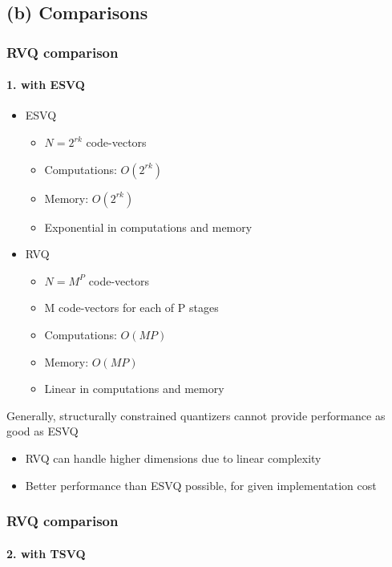 \subsection{(b) Comparisons}
\begin{frame}
\frametitle{RVQ comparison}\logoCSIPCPL\mypagenum
\framesubtitle{1. with ESVQ}
	\begin{itemize}
		\item ESVQ
			\begin{itemize}
				\item $N=2^{rk}$ code-vectors
				\item Computations: $O(2^{rk})$
				\item Memory: $O(2^{rk})$
				\item Exponential in computations and memory
			\end{itemize}
		\item RVQ
			\begin{itemize}
				\item $N={M^P}$ code-vectors
				\item M code-vectors for each of P stages
				\item Computations: $O(MP)$
				\item Memory: $O(MP)$
				\item Linear in computations and memory
			\end{itemize}
	\end{itemize}
	Generally, structurally constrained quantizers cannot provide performance as good as ESVQ
	\begin{itemize}
		\item RVQ can handle higher dimensions due to linear complexity
		\item Better performance than ESVQ possible, for given implementation cost
	\end{itemize}	
\end{frame}


\begin{frame}[plain]
\frametitle{RVQ comparison}
\framesubtitle{2. with TSVQ}
\logoCSIPCPL\mypagenum
\end{frame}



